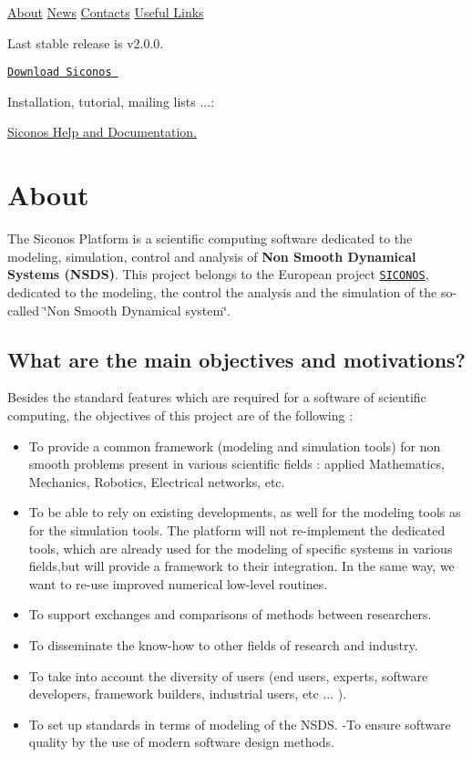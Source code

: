   \hyperlink{index_about}{About} \hyperlink{index_news}{News} \hyperlink{index_contacts}{Contacts} \hyperlink{index_links}{Useful Links}\par
   Last stable release is v2.0.0. \par
 \href{https://gforge.inria.fr/frs/?group_id=9}{\tt Download Siconos } \par
 Installation, tutorial, mailing lists ...: \par
 \hyperlink{SiconosDocList}{Siconos Help and Documentation.}\par
      \hypertarget{index_about}{}\section{About}\label{index_about}
The Siconos Platform is a scientific computing software dedicated to the modeling, simulation, control and analysis of {\bf Non Smooth Dynamical Systems (NSDS)}. This project belongs to the European project \href{http://siconos.inrialpes.fr/}{\tt SICONOS}, dedicated to the modeling, the control the analysis and the simulation of the so-called \char`\"{}Non Smooth Dynamical system\char`\"{}.\par
 \hypertarget{index_MainObj}{}\subsection{What are the main objectives and motivations?}\label{index_MainObj}
Besides the standard features which are required for a software of scientific computing, the objectives of this project are of the following :\begin{itemize}
\item To provide a common framework (modeling and simulation tools) for non smooth problems present in various scientific fields : applied Mathematics, Mechanics, Robotics, Electrical networks, etc.\item To be able to rely on existing developments, as well for the modeling tools as for the simulation tools. The platform will not re-implement the dedicated tools, which are already used for the modeling of specific systems in various fields,but will provide a framework to their integration. In the same way, we want to re-use improved numerical low-level routines.\item To support exchanges and comparisons of methods between researchers.\item To disseminate the know-how to other fields of research and industry.\item To take into account the diversity of users (end users, experts, software developers, framework builders, industrial users, etc ... ).\item To set up standards in terms of modeling of the NSDS. -To ensure software quality by the use of modern software design methods. \end{itemize}
